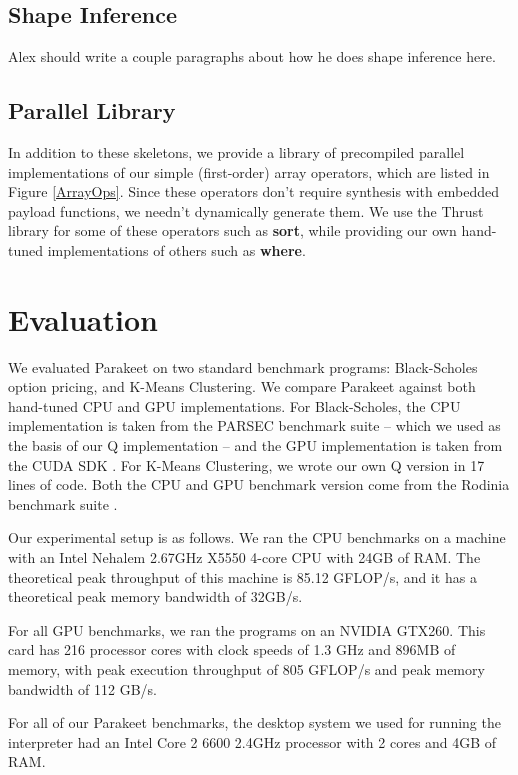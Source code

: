 \documentclass[preprint]{sigplanconf}
\begin{document}
\subsection{Shape Inference}
\label{shapeinference}

Alex should write a couple paragraphs about how he does shape inference here.

\subsection{Parallel Library}

In addition to these skeletons, we provide a library of precompiled parallel implementations of our simple (first-order) array operators, which are listed in Figure \ref{ArrayOps}.  Since these operators don't require synthesis with embedded payload functions, we needn't dynamically generate them.  We use the Thrust library \cite{Hobe10} for some of these operators such as \textbf{sort}, while providing our own hand-tuned implementations of others such as \textbf{where}.

\section{Evaluation}
\label{Evaluation}

We evaluated Parakeet on two standard benchmark programs: Black-Scholes option pricing, and K-Means Clustering.  We compare Parakeet against both hand-tuned CPU and GPU implementations.  For Black-Scholes, the CPU implementation is taken from the PARSEC \cite{Bien08} benchmark suite -- which we used as the basis
of our Q implementation -- and the GPU implementation is taken from the CUDA SDK \cite{NvidSD}.  For K-Means Clustering, we wrote our own Q version in 17 lines of code.  Both the CPU and GPU benchmark version come from the Rodinia benchmark suite \cite{Che09}.

Our experimental setup is as follows.  We ran the CPU benchmarks on a machine with an Intel Nehalem 2.67GHz X5550 4-core CPU with 24GB of RAM.  The theoretical peak throughput of this machine is 85.12 GFLOP/s, and it has a theoretical peak memory bandwidth of 32GB/s.

For all GPU benchmarks, we ran the programs on an NVIDIA GTX260. This card has 216 processor cores with clock speeds of 1.3 GHz and 896MB of memory, with peak execution throughput of 805 GFLOP/s and peak memory bandwidth of 112 GB/s.

For all of our Parakeet benchmarks, the desktop system we used for running the interpreter had an Intel Core 2 6600 2.4GHz processor with 2 cores and 4GB of RAM.
\end{document}
